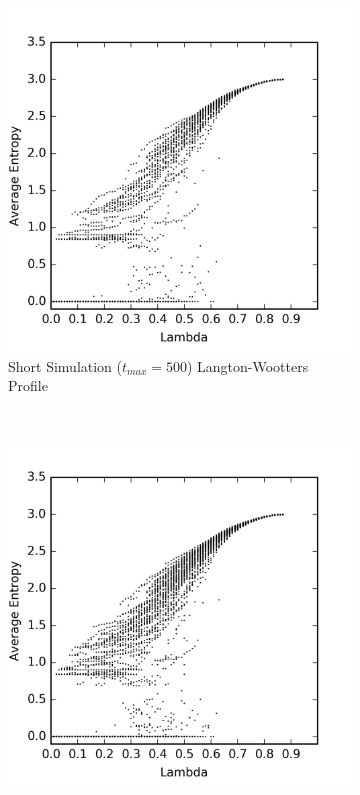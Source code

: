 \documentclass[a4paper,11pt]{article}
\begin{document}
\begin{figure}[htp]
\centering
  \begin{subfigure}[t]{0.65\textwidth}
  \includegraphics[width=\textwidth]{ch6_figs/reg_entropy_500_scatter}
  \caption{Short Simulation ($t_{max} = 500$) Langton-Wootters Profile}
  \label{fig:lw_profile_short}
  \end{subfigure}
  ~
  \begin{subfigure}[t]{0.65\textwidth}
  \centering
  \includegraphics[width=\textwidth]{ch6_figs/reg_entropy_1000_scatter}

\end{subfigure}
\end{figure}
\end{document}
